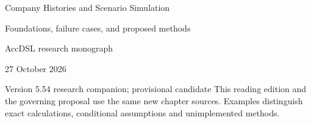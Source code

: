 \documentclass[11pt,a4paper]{report}
\begin{document}
\hypersetup{pageanchor=false}
\begin{titlepage}
{\Huge Company Histories and Scenario Simulation\par}
\vspace{12mm}
{\Large Foundations, failure cases, and proposed methods\par}
\vspace{8mm}
AccDSL research monograph\par 27 October 2026\par Version 5.54 research companion; provisional candidate
\vfill
This reading edition and the governing proposal use the same new chapter sources. Examples distinguish exact calculations, conditional assumptions and unimplemented methods.
\end{titlepage}
\hypersetup{pageanchor=true}
\tableofcontents
\clearpage{}


























\clearpage\label{sim:body-end}

\begingroup\raggedright
\endgroup
\end{document}
